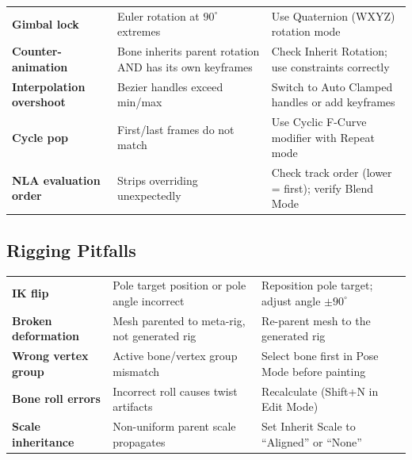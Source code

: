 \begin{center}
\begin{tabularx}{\textwidth}{L{2.5cm}L{3.5cm}X}
\toprule
{}
 &  &  \\
\midrule
\textbf{Gimbal lock} & Euler rotation at $90^\circ$ extremes & Use Quaternion (WXYZ) rotation mode \\
\textbf{Counter-animation} & Bone inherits parent rotation AND has its own keyframes & Check Inherit Rotation; use constraints correctly \\
\textbf{Interpolation overshoot} & Bezier handles exceed min/max & Switch to Auto Clamped handles or add keyframes \\
\textbf{Cycle pop} & First/last frames do not match & Use Cyclic F-Curve modifier with Repeat mode \\
\textbf{NLA evaluation order} & Strips overriding unexpectedly & Check track order (lower = first); verify Blend Mode \\
\bottomrule
\end{tabularx}
\end{center}

\subsection{Rigging Pitfalls}

\begin{center}
\begin{tabularx}{\textwidth}{L{2.5cm}L{3.5cm}X}
\toprule
{}
 &  &  \\
\midrule
\textbf{IK flip} & Pole target position or pole angle incorrect & Reposition pole target; adjust angle $\pm 90^\circ$ \\
\textbf{Broken deformation} & Mesh parented to meta-rig, not generated rig & Re-parent mesh to the generated rig \\
\textbf{Wrong vertex group} & Active bone/vertex group mismatch & Select bone first in Pose Mode before painting \\
\textbf{Bone roll errors} & Incorrect roll causes twist artifacts & Recalculate (Shift+N in Edit Mode) \\
\textbf{Scale inheritance} & Non-uniform parent scale propagates & Set Inherit Scale to ``Aligned'' or ``None'' \\
\bottomrule
\end{tabularx}
\end{center}

